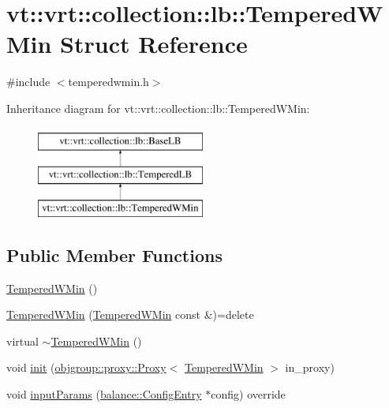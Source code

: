 \hypertarget{structvt_1_1vrt_1_1collection_1_1lb_1_1_tempered_w_min}{}\section{vt\+:\+:vrt\+:\+:collection\+:\+:lb\+:\+:Tempered\+W\+Min Struct Reference}
\label{structvt_1_1vrt_1_1collection_1_1lb_1_1_tempered_w_min}


{\ttfamily \#include $<$temperedwmin.\+h$>$}

Inheritance diagram for vt\+:\+:vrt\+:\+:collection\+:\+:lb\+:\+:Tempered\+W\+Min\+:\begin{figure}[H]
\begin{center}
\leavevmode
\includegraphics[height=3.000000cm]{structvt_1_1vrt_1_1collection_1_1lb_1_1_tempered_w_min}
\end{center}
\end{figure}
\subsection*{Public Member Functions}
\begin{DoxyCompactItemize}
\item 
\hyperlink{structvt_1_1vrt_1_1collection_1_1lb_1_1_tempered_w_min_a0651609fa1544383a93ef8c178be4780}{Tempered\+W\+Min} ()
\item 
\hyperlink{structvt_1_1vrt_1_1collection_1_1lb_1_1_tempered_w_min_a757b4b20c43d657d4ceba856c3da13ee}{Tempered\+W\+Min} (\hyperlink{structvt_1_1vrt_1_1collection_1_1lb_1_1_tempered_w_min}{Tempered\+W\+Min} const \&)=delete
\item 
virtual \hyperlink{structvt_1_1vrt_1_1collection_1_1lb_1_1_tempered_w_min_aff431266f3e3155a8993f3896b2291c4}{$\sim$\+Tempered\+W\+Min} ()
\item 
void \hyperlink{structvt_1_1vrt_1_1collection_1_1lb_1_1_tempered_w_min_a4568be2f1baa683968308e48a0743dea}{init} (\hyperlink{structvt_1_1objgroup_1_1proxy_1_1_proxy}{objgroup\+::proxy\+::\+Proxy}$<$ \hyperlink{structvt_1_1vrt_1_1collection_1_1lb_1_1_tempered_w_min}{Tempered\+W\+Min} $>$ in\+\_\+proxy)
\item 
void \hyperlink{structvt_1_1vrt_1_1collection_1_1lb_1_1_tempered_w_min_a0dd469ab6f3f8aebebf55c773df099ce}{input\+Params} (\hyperlink{structvt_1_1vrt_1_1collection_1_1balance_1_1_config_entry}{balance\+::\+Config\+Entry} $\ast$config) override
\end{DoxyCompactItemize}
